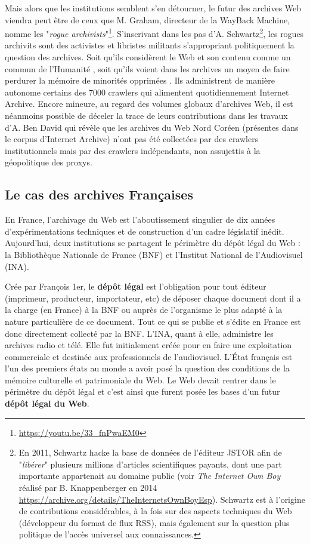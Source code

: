 \documentclass[symmetric,justified,marginals=raggedouter]{tufte-book}
\begin{document}
Mais alors que les institutions semblent s'en détourner, le futur des archives Web viendra peut être de ceux que M. Graham, directeur de la WayBack Machine, nomme les "\textit{rogue archivists}"\footnote{\url{https://youtu.be/33_fnPwaEM0}}. S'inscrivant dans les pas d'A. Schwartz\footnote{En 2011, Schwartz hacke la base de données de l'éditeur JSTOR afin de "\textit{libérer}" plusieurs millions d'articles scientifiques payants, dont une part importante appartenait au domaine public (voir \textit{The Internet Own Boy} réalisé par B. Knappenberger en 2014 \url{https://archive.org/details/TheInternetsOwnBoyEsp}). Schwartz est à l'origine de contributions considérables, à la fois sur des aspects techniques du Web (développeur du format de flux RSS), mais également sur la question plus politique de l'accès universel aux connaissances.}, les rogues archivits sont des activistes et libristes militants s'appropriant politiquement la question des archives. Soit qu'ils considèrent le Web et son contenu comme un commun de l'Humanité \citep{coriat_retour_2015}, soit qu'ils voient dans les archives un moyen de faire perdurer la mémoire de minorités opprimées \citep{de_kosnik_rogue_2016}. Ils administrent de manière autonome certains des 7000 crawlers qui alimentent quotidiennement Internet Archive. Encore mineure, au regard des volumes globaux d'archives Web, il est néanmoins possible de déceler la trace de leurs contributions dans les travaux d'A. Ben David \citep{ben-david_internet_2018} qui révèle que les archives du Web Nord Coréen (présentes dans le corpus d'Internet Archive) n'ont pas été collectées par des crawlers institutionnels mais par des crawlers indépendants, non assujettis à la géopolitique des proxys.       

\subsection{Le cas des archives Françaises}

\noindent En France, l'archivage du Web est l'aboutissement singulier de dix années d'expérimentations techniques et de construction d'un cadre législatif inédit. Aujourd'hui, deux institutions se partagent le périmètre du dépôt légal du Web : la Bibliothèque Nationale de France (BNF) et l'Institut National de l'Audiovisuel (INA). 

Crée par François 1er, le \textbf{dépôt légal} est l'obligation pour tout éditeur (imprimeur, producteur, importateur, etc) de déposer chaque document dont il a la charge (en France) à la BNF ou auprès de l'organisme le plus adapté à la nature particulière de ce document. Tout ce qui se publie et s'édite en France est donc directement collecté par la BNF. L'INA, quant à elle, administre les archives radio et télé. Elle fut initialement créée pour en faire une exploitation commerciale et destinée aux professionnels de l'audiovisuel. L'État français est l'un des premiers états au monde a avoir posé la question des conditions de la mémoire culturelle et patrimoniale du Web. Le Web devait rentrer dans le périmètre du dépôt légal et c'est ainsi que furent posée les bases d'un futur \textbf{dépôt légal du Web}.
\end{document}

